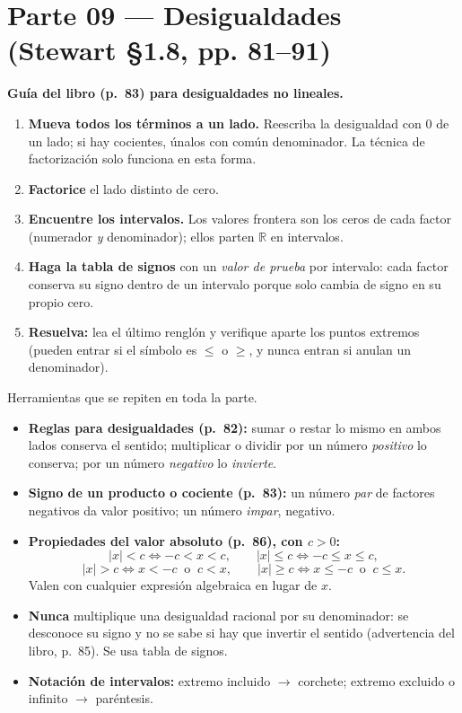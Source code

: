 \documentclass[11pt]{article}
\begin{document}
\section*{Parte 09 --- Desigualdades (Stewart §1.8, pp. 81--91)}

\begin{teo}
\textbf{Guía del libro (p.~83) para desigualdades no lineales.}
\begin{enumerate}[leftmargin=*]
\item \textbf{Mueva todos los términos a un lado.} Reescriba la desigualdad con $0$ de un lado; si hay cocientes, únalos con común denominador. La técnica de factorización solo funciona en esta forma.
\item \textbf{Factorice} el lado distinto de cero.
\item \textbf{Encuentre los intervalos.} Los valores frontera son los ceros de cada factor (numerador \emph{y} denominador); ellos parten $\mathbb{R}$ en intervalos.
\item \textbf{Haga la tabla de signos} con un \emph{valor de prueba} por intervalo: cada factor conserva su signo dentro de un intervalo porque solo cambia de signo en su propio cero.
\item \textbf{Resuelva:} lea el último renglón y verifique aparte los puntos extremos (pueden entrar si el símbolo es $\le$ o $\ge$, y nunca entran si anulan un denominador).
\end{enumerate}
\end{teo}

\begin{tip}
Herramientas que se repiten en toda la parte.
\begin{itemize}[leftmargin=*]
\item \textbf{Reglas para desigualdades (p.~82):} sumar o restar lo mismo en ambos lados conserva el sentido; multiplicar o dividir por un número \emph{positivo} lo conserva; por un número \emph{negativo} lo \emph{invierte}.
\item \textbf{Signo de un producto o cociente (p.~83):} un número \emph{par} de factores negativos da valor positivo; un número \emph{impar}, negativo.
\item \textbf{Propiedades del valor absoluto (p.~86), con $c>0$:}
\[
|x|<c \iff -c<x<c, \qquad |x|\le c \iff -c\le x\le c,
\]
\[
|x|>c \iff x<-c \ \text{ o } \ c<x, \qquad |x|\ge c \iff x\le -c \ \text{ o } \ c\le x.
\]
Valen con cualquier expresión algebraica en lugar de $x$.
\item \textbf{Nunca} multiplique una desigualdad racional por su denominador: se desconoce su signo y no se sabe si hay que invertir el sentido (advertencia del libro, p.~85). Se usa tabla de signos.
\item \textbf{Notación de intervalos:} extremo incluido $\to$ corchete; extremo excluido o infinito $\to$ paréntesis.
\end{itemize}
\end{tip}
\end{document}
